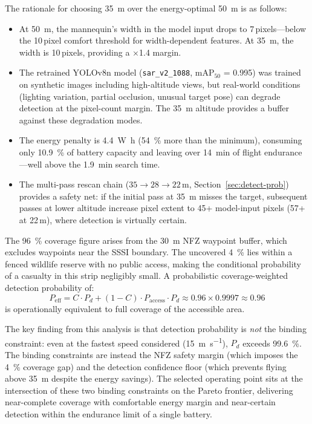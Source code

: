 The rationale for choosing \SI{35}{\metre} over the energy-optimal \SI{50}{\metre} is as follows:

\begin{itemize}
  \item At \SI{50}{\metre}, the mannequin's width in the model input drops to 7\,pixels---below the 10\,pixel comfort threshold for width-dependent features.
        At \SI{35}{\metre}, the width is 10\,pixels, providing a $\times$1.4 margin.
  \item The retrained YOLOv8n model (\texttt{sar\_v2\_1088}, mAP$_{50}$ = 0.995) was trained on synthetic images including high-altitude views, but real-world conditions (lighting variation, partial occlusion, unusual target pose) can degrade detection at the pixel-count margin.
        The \SI{35}{\metre} altitude provides a buffer against these degradation modes.
  \item The energy penalty is \SI{4.4}{\watt\hour} (\SI{54}{\percent} more than the minimum), consuming only \SI{10.9}{\percent} of battery capacity and leaving over \SI{14}{\minute} of flight endurance---well above the \SI{1.9}{\minute} search time.
  \item The multi-pass rescan chain ($35 \to 28 \to 22$\,m, Section~\ref{sec:detect-prob}) provides a safety net: if the initial pass at \SI{35}{\metre} misses the target, subsequent passes at lower altitude increase pixel extent to 45+ model-input pixels (57+ at 22\,m), where detection is virtually certain.
\end{itemize}

The \SI{96}{\percent} coverage figure arises from the \SI{30}{\metre} NFZ waypoint buffer, which excludes waypoints near the SSSI boundary.
The uncovered \SI{4}{\percent} lies within a fenced wildlife reserve with no public access, making the conditional probability of a casualty in this strip negligibly small.
A probabilistic coverage-weighted detection probability of:
\begin{equation}
  P_{\mathrm{eff}} = C \cdot P_d + (1 - C) \cdot P_{\mathrm{access}} \cdot P_d \approx 0.96 \times 0.9997 \approx 0.96
\end{equation}
\noindent is operationally equivalent to full coverage of the accessible area.

The key finding from this analysis is that detection probability is \emph{not} the binding constraint: even at the fastest speed considered (\SI{15}{\metre\per\second}), $P_d$ exceeds \SI{99.6}{\percent}.
The binding constraints are instead the NFZ safety margin (which imposes the \SI{4}{\percent} coverage gap) and the detection confidence floor (which prevents flying above \SI{35}{\metre} despite the energy savings).
The selected operating point sits at the intersection of these two binding constraints on the Pareto frontier, delivering near-complete coverage with comfortable energy margin and near-certain detection within the endurance limit of a single battery.
